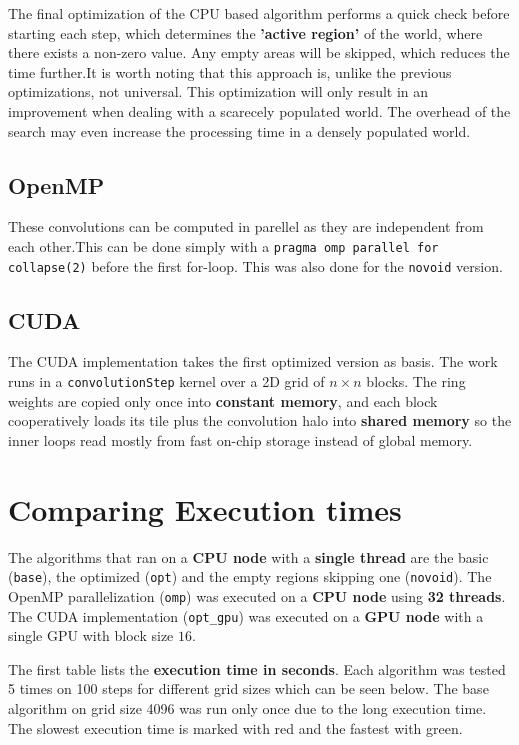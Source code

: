 \documentclass[11pt]{article}
\begin{document}
The final optimization of the CPU based algorithm performs a quick check before starting each step, which determines the \textbf{'active region'} of the world, where there exists a non-zero value. Any empty areas will be skipped, which reduces the time further.It is worth noting that this approach is, unlike the previous optimizations, not universal. This optimization will only result in an improvement when dealing with a scarecely populated world. The overhead of the search may even increase the processing time in a densely populated world.

\subsection{OpenMP}

These convolutions can be computed in parellel as they are independent from each other.This can be done simply with a \texttt{pragma omp parallel for collapse(2)}
before the first for-loop. This was also done for the \texttt{novoid} version.

\subsection{CUDA}

The CUDA implementation takes the first optimized version as basis. The work runs in a \texttt{convolutionStep} kernel over a 2D grid of $n\times n$ blocks. The ring weights are copied only once into \textbf{constant memory}, and each block cooperatively loads its tile plus the convolution halo into \textbf{shared memory} so the inner loops read mostly from fast on-chip storage instead of global memory. 

\section{Comparing Execution times}

The algorithms that ran on a \textbf{CPU node} with a \textbf{single thread} are the basic (\texttt{base}), the optimized (\texttt{opt}) and the empty regions skipping one (\texttt{novoid}). The OpenMP parallelization (\texttt{omp}) was executed on a \textbf{CPU node} using \textbf{32 threads}. The CUDA implementation (\texttt{opt\_gpu}) was executed on a \textbf{GPU node} with a single GPU with block size $16$.

The first table lists the \textbf{execution time in seconds}. Each algorithm was tested 5 times on 100 steps for different grid sizes which can be seen below. The base algorithm on grid size 4096 was run only once due to the long execution time. The slowest execution time is marked with red and the fastest with green.
\end{document}
